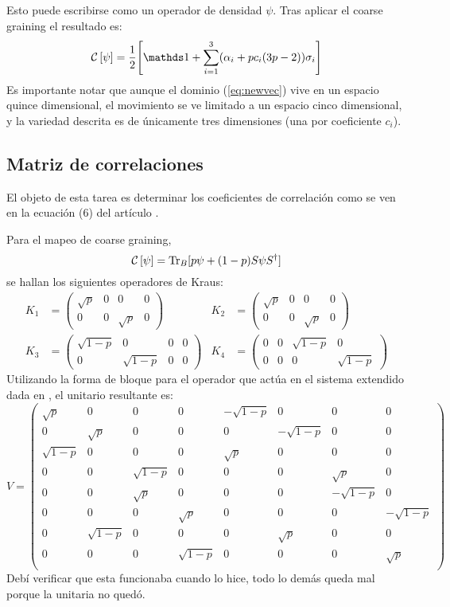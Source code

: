 Esto puede escribirse como un operador de densidad $\psi$. Tras aplicar el coarse graining el resultado es:
\begin{equation}
    \CG{\psi} = \frac{1}{2}\qty[\Id + \sum_{i=1}^3(\alpha_{i}+pc_{i}(3p-2))\sigma_i]\label{eq:newcoarse}
\end{equation}
Es importante notar que aunque el dominio (\ref{eq:newvec}) vive en un espacio quince dimensional, el movimiento se ve limitado a un espacio cinco dimensional, y la variedad descrita es de únicamente tres dimensiones (una por coeficiente $c_{i}$).

\subsection{Matriz de correlaciones}

El objeto de esta tarea es determinar los coeficientes de correlación como se ven en la ecuación (6) del artículo \cite{CGEmergingDynamics}.


Para el mapeo de coarse graining,
\begin{equation}
\mathcal{C}\left[\psi\right]=\Tr_{B}[p\psi+(1-p)S\psi S^{\dag}]
\end{equation}
se hallan los siguientes operadores de Kraus:
\begin{align}
    K_{1}&=\begin{pmatrix} \sqrt{p}&0&0&0\\0&0&\sqrt{p}&0\end{pmatrix} & K_{2}&=\begin{pmatrix} \sqrt{p}&0&0&0\\0&0&\sqrt{p}&0\end{pmatrix} \\ K_{3}&=\begin{pmatrix} \sqrt{1-p}&0&0&0\\0&\sqrt{1-p}&0&0\end{pmatrix} & K_{4}&=\begin{pmatrix} 0&0&\sqrt{1-p}&0\\0&0&0&\sqrt{1-p}\end{pmatrix}
\end{align}
Utilizando la forma de bloque para el operador que actúa en el sistema extendido dada en \cite{Chuang}, el unitario resultante es:
\begin{equation}
V=\begin{pmatrix}
    \sqrt{p} & 0 & 0 & 0 & -\sqrt{1-p} & 0 & 0 & 0 \\
    0 & \sqrt{p} & 0 & 0 & 0 & -\sqrt{1-p} & 0 & 0 \\
    \sqrt{1-p} & 0 & 0 & 0 & \sqrt{p} & 0 & 0 & 0 \\
    0 & 0 & \sqrt{1-p} & 0 & 0 & 0 & \sqrt{p} & 0 \\
    0 & 0 & \sqrt{p} & 0 & 0 & 0 & -\sqrt{1-p} & 0 \\
    0 & 0 & 0 & \sqrt{p} & 0 & 0 & 0 & -\sqrt{1-p} \\
    0 & \sqrt{1-p} & 0 & 0 & 0 & \sqrt{p} & 0 & 0 \\
    0 & 0 & 0 & \sqrt{1-p} & 0 & 0 & 0 & \sqrt{p} \\
\end{pmatrix}
\end{equation}
Debí verificar que esta funcionaba cuando lo hice, todo lo demás queda mal porque la unitaria no quedó.

